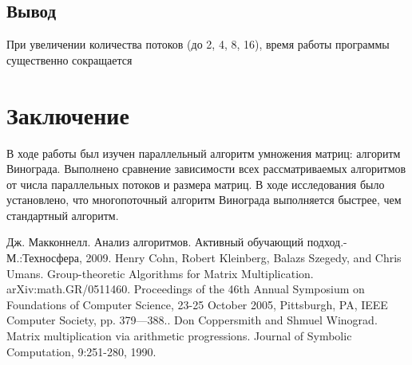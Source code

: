\documentclass[a4paper, 14pt]{article}
\begin{document}
	\subsection{Вывод}
	
	При увеличении количества потоков (до 2, 4, 8, 16), время работы программы существенно сокращается\\

	\newpage
	\section*{Заключение}
	
 
В ходе работы был изучен параллельный алгоритм умножения матриц: алгоритм Винограда. Выполнено сравнение зависимости всех рассматриваемых алгоритмов от числа параллельных потоков и размера матриц. В ходе исследования было установлено, что многопоточный алгоритм Винограда выполняется быстрее, чем стандартный алгоритм. 
\newpage
{}

\begin{thebibliography}{}
      Дж. Макконнелл. Анализ алгоритмов. Активный обучающий подход.-М.:Техносфера, 2009.
     Henry Cohn, Robert Kleinberg, Balazs Szegedy, and Chris Umans. Group-theoretic Algorithms for Matrix Multiplication. arXiv:math.GR/0511460. Proceedings of the 46th Annual Symposium on Foundations of Computer Science, 23-25 October 2005, Pittsburgh, PA, IEEE Computer Society, pp. 379—388.. 
     Don Coppersmith and Shmuel Winograd. Matrix multiplication via arithmetic progressions. Journal of Symbolic Computation, 9:251-280, 1990.
\end{thebibliography}
	
	\newpage
	
	
	
\end{document}
